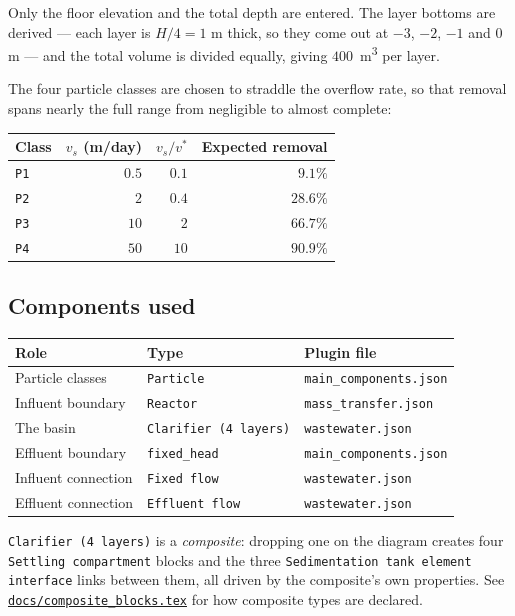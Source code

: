 \documentclass[11pt,a4paper]{article}
\newcommand{\code}[1]{\texttt{\small #1}}
\newcommand{\file}[1]{\texttt{\small #1}}
\newcommand{\ghbase}{https://github.com/ArashMassoudieh/OpenHydroQual/blob/master}
\newcommand{\exfile}[1]{\href{\ghbase/#1}{\file{#1}}}
\begin{document}
Only the floor elevation and the total depth are entered. The layer bottoms are
derived --- each layer is $H/4=1$ m thick, so they come out at $-3$, $-2$, $-1$
and $0$ m --- and the total volume is divided equally, giving
$400$~m\textsuperscript{3} per layer.

The four particle classes are chosen to straddle the overflow rate, so that
removal spans nearly the full range from negligible to almost complete:

\begin{center}
\begin{tabular}{lrrr}
\toprule
Class & $v_s$ (m/day) & $v_s/v^{*}$ & Expected removal \\
\midrule
\code{P1} & $0.5$ & $0.1$ & $9.1\%$ \\
\code{P2} & $2$   & $0.4$ & $28.6\%$ \\
\code{P3} & $10$  & $2$   & $66.7\%$ \\
\code{P4} & $50$  & $10$  & $90.9\%$ \\
\bottomrule
\end{tabular}
\end{center}

\subsection{Components used}

\begin{center}
\begin{tabular}{lll}
\toprule
Role & Type & Plugin file \\
\midrule
Particle classes      & \code{Particle}                & \file{main\_components.json} \\
Influent boundary     & \code{Reactor}                 & \file{mass\_transfer.json} \\
The basin             & \code{Clarifier (4 layers)}    & \file{wastewater.json} \\
Effluent boundary     & \code{fixed\_head}             & \file{main\_components.json} \\
Influent connection   & \code{Fixed flow}              & \file{wastewater.json} \\
Effluent connection   & \code{Effluent flow}           & \file{wastewater.json} \\
\bottomrule
\end{tabular}
\end{center}

\code{Clarifier (4 layers)} is a \emph{composite}: dropping one on the diagram
creates four \code{Settling compartment} blocks and the three
\code{Sedimentation tank element interface} links between them, all driven by
the composite's own properties. See \exfile{docs/composite\_blocks.tex} for how
composite types are declared.
\end{document}
